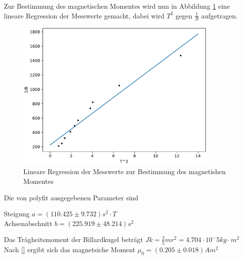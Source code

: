 Zur Bestimmung des magnetischen Momentes wird nun in Abbildung \ref{fig:plot2} eine lineare Regression der Messwerte gemacht, dabei wird $T^2$ gegen $\frac{1}{B}$ aufgetragen.
\begin{figure}
  \centering
  \includegraphics[width = 10cm]{plot2.pdf}
  \caption{Lineare Regression der Messwerte zur Bestimmung des magnetishen Momentes}
  \label{fig:plot2}
\end{figure}
Die von polyfit \cite{numpy} ausgegebenen Parameter sind\\

\begin{centering}
Steigung $a = (110.425 ± 9.732) s^2 \cdot T$\\
Achsenabschnitt $b = (225.919 ± 48.214) s^2$\\
\end{centering}

Das Trägheitsmoment der Billardkugel beträgt $Jk = \frac{2}{5}mr^2 = 4.704 \cdot 10^-5 kg\cdot m^2$\\

Nach \ref{} ergibt sich das magnetsiche Moment $\mu_0 = (0.205 \pm 0.018) Am^2$
\newpage


